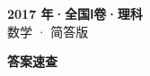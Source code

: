 \documentclass[zihao=-4, a4paper]{ctexart}
\begin{document}
\begin{center}
  {\Large\bfseries 2017 年·全国Ⅰ卷·理科}\\[4pt]
  {\large 数学 · 简答版}
\end{center}
\medskip
{}

\clearpage
{}
\begin{center}{\Large\bfseries 答案速查}\end{center}
\medskip

\end{document}
